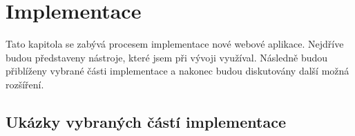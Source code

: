 \chapter{Implementace}
Tato kapitola se zabývá procesem implementace nové webové aplikace. Nejdříve budou představeny nástroje, které jsem při vývoji využíval. Následně budou přiblíženy vybrané části implementace a nakonec budou diskutovány další možná rozšíření.



\section{Ukázky vybraných částí implementace}





